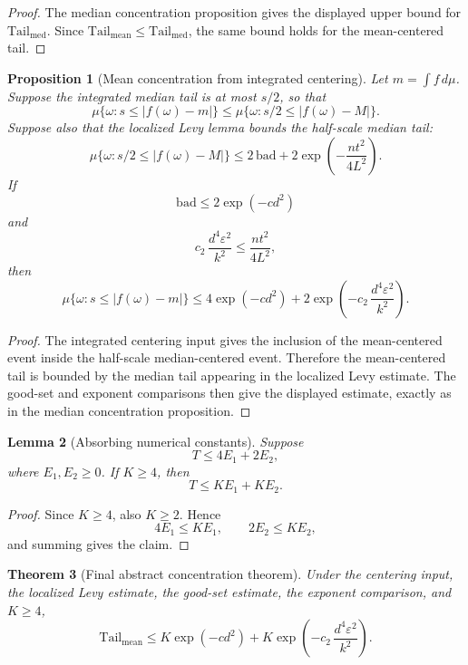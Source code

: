 \documentclass[11pt]{article}
\newtheorem{theorem}{Theorem}[section]
\newtheorem{lemma}[theorem]{Lemma}
\newtheorem{proposition}[theorem]{Proposition}
\begin{document}
\begin{proof}
The median concentration proposition gives the displayed upper bound for
\(\mathrm{Tail}_{\mathrm{med}}\).  Since
\(\mathrm{Tail}_{\mathrm{mean}}\le\mathrm{Tail}_{\mathrm{med}}\), the same
bound holds for the mean-centered tail.
\end{proof}

\begin{proposition}[Mean concentration from integrated centering]
Let \(m=\int f\,d\mu\).  Suppose the integrated median tail is at most
\(s/2\), so that
\[
 \mu\{\omega:s\le |f(\omega)-m|\}
 \le
 \mu\{\omega:s/2\le |f(\omega)-M|\}.
\]
Suppose also that the localized Levy lemma bounds the half-scale median tail:
\[
 \mu\{\omega:s/2\le |f(\omega)-M|\}
 \le
 2\,\mathrm{bad}
 +2\exp\!\left(-\frac{nt^2}{4L^2}\right).
\]
If
\[
 \mathrm{bad}\le 2\exp(-c d^2)
\]
and
\[
 c_2\,\frac{d^4\varepsilon^2}{k^2}
 \le
 \frac{nt^2}{4L^2},
\]
then
\[
 \mu\{\omega:s\le |f(\omega)-m|\}
 \le
 4\exp(-c d^2)
 +2\exp\!\left(-c_2\,\frac{d^4\varepsilon^2}{k^2}\right).
\]
\end{proposition}

\begin{proof}
The integrated centering input gives the inclusion of the mean-centered event
inside the half-scale median-centered event.  Therefore the mean-centered
tail is bounded by the median tail appearing in the localized Levy estimate.
The good-set and exponent comparisons then give the displayed estimate,
exactly as in the median concentration proposition.
\end{proof}

\begin{lemma}[Absorbing numerical constants]
Suppose
\[
  T\le 4E_1+2E_2,
\]
where \(E_1,E_2\ge0\).  If \(K\ge4\), then
\[
  T\le K E_1+K E_2.
\]
\end{lemma}

\begin{proof}
Since \(K\ge4\), also \(K\ge2\).  Hence
\[
  4E_1\le KE_1,\qquad 2E_2\le KE_2,
\]
and summing gives the claim.
\end{proof}

\begin{theorem}[Final abstract concentration theorem]
Under the centering input, the localized Levy estimate, the good-set estimate,
the exponent comparison, and \(K\ge4\),
\[
 \mathrm{Tail}_{\mathrm{mean}}
 \le
 K\exp(-c d^2)
 +K\exp\!\left(-c_2\,\frac{d^4\varepsilon^2}{k^2}\right).
\]
\end{theorem}
\end{document}

